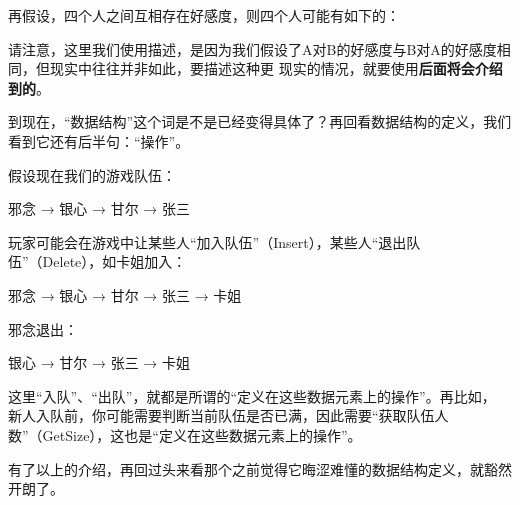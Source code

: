 再假设，四个人之间互相存在好感度，则四个人可能有如下的：
\begin{bulk}
\begin{center}
\end{center}
\end{bulk}
请注意，这里我们使用描述，是因为我们假设了A对B的好感度与B对A的好感度相同，但现实中往往并非如此，要描述这种更
现实的情况，就要使用{\color{red}\textbf{后面将会介绍到的}}。

到现在，“数据结构”这个词是不是已经变得具体了？再回看数据结构的定义，我们看到它还有后半句：“操作”。

假设现在我们的游戏队伍：
\begin{bulk}
\begin{center}
邪念 → 银心 → 甘尔 → 张三
\end{center}
\end{bulk}
玩家可能会在游戏中让某些人“加入队伍”（Insert），某些人“退出队伍”（Delete），如卡姐加入：
\begin{bulk}
\begin{center}
邪念 → 银心 → 甘尔 → 张三 → 卡姐
\end{center}
\end{bulk}
邪念退出：
\begin{bulk}
\begin{center}
银心 → 甘尔 → 张三 → 卡姐
\end{center}
\end{bulk}
这里“入队”、“出队”，就都是所谓的“定义在这些数据元素上的操作”。再比如，
新人入队前，你可能需要判断当前队伍是否已满，因此需要“获取队伍人数”（GetSize），这也是“定义在这些数据元素上的操作”。

有了以上的介绍，再回过头来看那个之前觉得它晦涩难懂的数据结构定义，就豁然开朗了。

